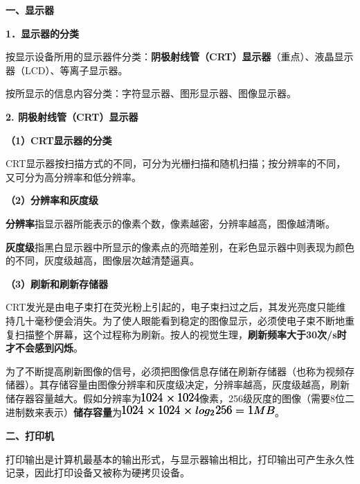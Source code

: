 {\textbf{{一、显示器}}}

{\textbf{1．显示器的分类}}

按显示设备{所用的显示器件}分类：\textbf{阴极射线管（CRT）显示器}{（重点）、液晶显示器（LCD）、等离子显示器。}

按所{显示的信息内容}分类：{字符显示器、图形显示器、图像显示器。}

\textbf{2. 阴极射线管（CRT）显示器}

\textbf{（1）CRT显示器的分类}

CRT显示器按扫描方式的不同，可分为光栅扫描和随机扫描；按分辨率的不同，又可分为高分辨率和低分辨率。

\textbf{（2）分辨率和灰度级}

\textbf{分辨率}指显示器所能表示的像素个数，像素越密，分辨率越高，图像越清晰。

\textbf{灰度级}指黑白显示器中所显示的像素点的亮暗差别，在彩色显示器中则表现为颜色的不同，灰度级越高，图像层次越清楚逼真。

\textbf{（3）刷新和刷新存储器}

CRT发光是由电子束打在荧光粉上引起的，电子束扫过之后，其发光亮度只能维持几十毫秒便会消失。为了使人眼能看到稳定的图像显示，必须使电子束不断地重复扫描整个屏幕，这个过程称为刷新。按人的视觉生理，\textbf{刷新频率大于30次/s时才不会感到闪烁}。

为了不断提高刷新图像的信号，必须把图像信息存储在刷新存储器（也称为视频存储器）。其存储容量由图像分辨率和灰度级决定，分辨率越高，灰度级越高，刷新储存器容量越大。假如分辨率为\includegraphics[width=0.87500in,height=0.13542in]{texmath/0423981024times1024}像素，256级灰度的图像（需要8位二进制数来表示）\textbf{储存容量}为\includegraphics[width=2.30208in,height=0.16667in]{texmath/523f1a1024times1024timeslog22561MB}。

{\textbf{{二、打印机}}}

打印输出是计算机最基本的输出形式，与显示器输出相比，打印输出可产生永久性记录，因此打印设备又被称为硬拷贝设备。
